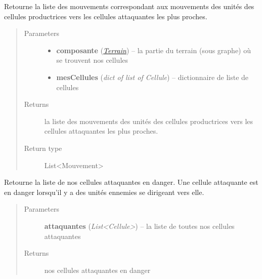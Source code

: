 \documentclass[letterpaper,10pt,english]{sphinxmanual}
\begin{document}
\begin{fulllineitems}
\begin{fulllineitems}
\label{index:StrategieAnalyse.StrategieAnalyse.envoyerUnitesProductrices}
Retourne la liste des mouvements correspondant aux mouvements des unités des cellules productrices vers les cellules attaquantes les plus proches.
\begin{quote}\begin{description}
\item[{Parameters}] \leavevmode\begin{itemize}
\item {} 
\textbf{composante} ({\hyperref[index:module-Terrain]{\emph{Terrain}}}) -- la partie du terrain (sous graphe) où se trouvent nos cellules

\item {} 
\textbf{mesCellules} (\emph{dict of list of Cellule}) -- dictionnaire de liste de cellules

\end{itemize}

\item[{Returns}] \leavevmode
la liste des mouvements des unités des cellules productrices vers les cellules attaquantes les plus proches.

\item[{Return type}] \leavevmode
List\textless{}Mouvement\textgreater{}

\end{description}\end{quote}

\end{fulllineitems}


\begin{fulllineitems}
\label{index:StrategieAnalyse.StrategieAnalyse.getAttaquantesEnDanger}
Retourne la liste de nos cellules attaquantes en danger.
Une cellule attaquante est en danger lorsqu'il y a des unités ennemies se dirigeant vers elle.
\begin{quote}\begin{description}
\item[{Parameters}] \leavevmode
\textbf{attaquantes} (\emph{List\textless{}Cellule\textgreater{}}) -- la liste de toutes nos cellules attaquantes

\item[{Returns}] \leavevmode
nos cellules attaquantes en danger


\end{description}
\end{quote}
\end{fulllineitems}
\end{fulllineitems}
\end{document}
